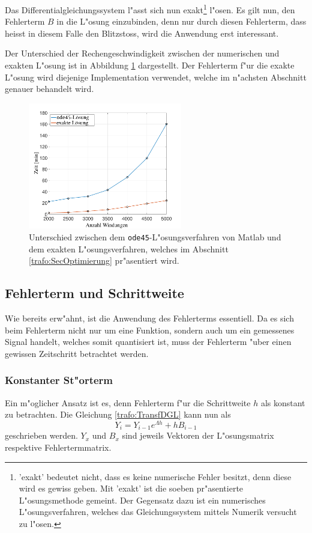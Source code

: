 \begin{refsection}
Das Differentialgleichungssystem l"asst sich nun exakt\footnote{'exakt' bedeutet nicht, dass es keine numerische Fehler besitzt, denn diese wird es gewiss geben. Mit 'exakt' ist die soeben pr"asentierte L"osungsmethode gemeint. Der Gegensatz dazu ist ein numerisches L"osungsverfahren, welches das Gleichungssystem mittels Numerik versucht zu l"osen.} l"osen. Es gilt nun, den Fehlerterm $B$ in die L"osung einzubinden, denn nur durch diesen Fehlerterm, dass heisst in diesem Falle den Blitzstoss, wird die Anwendung erst interessant.

Der Unterschied der Rechengeschwindigkeit zwischen der numerischen und exakten L"osung ist in Abbildung \ref{trafo:ode45vsExact} dargestellt. Der Fehlerterm f"ur die exakte L"osung wird diejenige Implementation verwendet, welche im n"achsten Abschnitt genauer behandelt wird. 

	\begin{figure}
		\centering
		\includegraphics[width=0.6\textwidth]{./trafo/images/ode45vsExact.pdf}
		\caption{Unterschied zwischen dem \texttt{ode45}-L"osungsverfahren von Matlab und dem exakten L"osungsverfahren, welches im Abschnitt \ref{trafo:SecOptimierung} pr"asentiert wird.}
		\label{trafo:ode45vsExact}
	\end{figure}


\subsection{Fehlerterm und Schrittweite}
Wie bereits erw"ahnt, ist die Anwendung des Fehlerterms essentiell. Da es sich beim Fehlerterm nicht nur um eine Funktion, sondern auch um ein gemessenes Signal handelt, welches somit quantisiert ist, muss der Fehlerterm "uber einen gewissen Zeitschritt betrachtet werden.

\subsubsection{Konstanter St"orterm}
Ein m"oglicher Ansatz ist es, denn Fehlerterm f"ur die Schrittweite $h$ als konstant zu betrachten. Die Gleichung \ref{trafo:TransfDGL} kann nun als
\begin{equation*}
	Y_i = Y_{i-1} e^{\Lambda h}  + h B_{i-1}
\end{equation*}
geschrieben werden. $Y_x$ und $B_x$ sind jeweils Vektoren der L"osungsmatrix respektive Fehlertermmatrix. 


\end{refsection}
